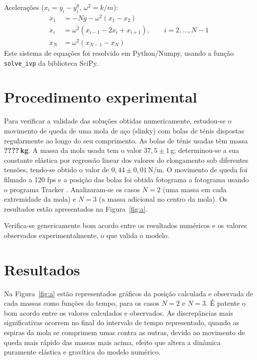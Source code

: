 \documentclass{article}
\begin{document}
Acelerações ($x_i=y_i-y_i^0$, $\omega^2=k/m$):
\begin{equation}
  \begin{aligned}
    \ddot x_1 &=-Ng-\omega^2(x_1-x_2)\\
    \ddot x_i &= \omega^2(x_{i-1}-2x_i+x_{i+1}),\qquad i=2, \ldots, N-1\\
    \ddot x_{N} &=\omega^2(x_{N-1}-x_{N})
  \end{aligned}
\end{equation}
Este sistema de equações foi resolvido em Python/Numpy, usando a função
\texttt{solve\_ivp} da biblioteca SciPy.

\section*{Procedimento experimental}
Para verificar a validade das soluções obtidas numericamente, estudou-se o
movimento de queda de uma mola de aço (slinky) com bolas de ténis dispostas
regularmente ao longo do seu comprimento.  As bolas de ténis usadas têm massa
\textbf{\color{red}????\,kg}.  A massa da mola usada tem o valor $37,5\pm1$\,g;
determinou-se a sua constante elástica por regressão linear dos valores do
elongamento sob diferentes tensões, tendo-se obtido o valor de
$0,44\pm0,01$\,N/m.  O movimento de queda foi filmado a 120 fps e a posição das
bolas foi obtida fotograma a fotograma usando o programa Tracker \cite{Tracker}.
Analizaram-se os casos $N=2$ (uma massa em cada extremidade da mola) e $N=3$ (a
massa adicional no centro da mola). Os resultados estão apresentados na
Figura~\ref{fig:a}.

Verifica-se genericamente bom acordo entre os resultados numéricos e os valores
observados experimentalmente, o que valida o modelo.

\section*{Resultados}
Na Figura~\ref{fig:a}  estão representados gráficos da posição calculada e
observada de cada massas como funções do tempo, para os casos $N=2$ e $N=3$. É
patente o bom acordo entre os valores calculados e observados. As discrepâncias
mais significativas ocorrem no final do intervalo de tempo representado, quando
as espiras da mola se comprimem umas contra as outras, devido ao movimento de
queda mais rápido das massas mais acima, efeito que altera a dinâmica puramente
elástica e gravítica do modelo numérico.
\end{document}
